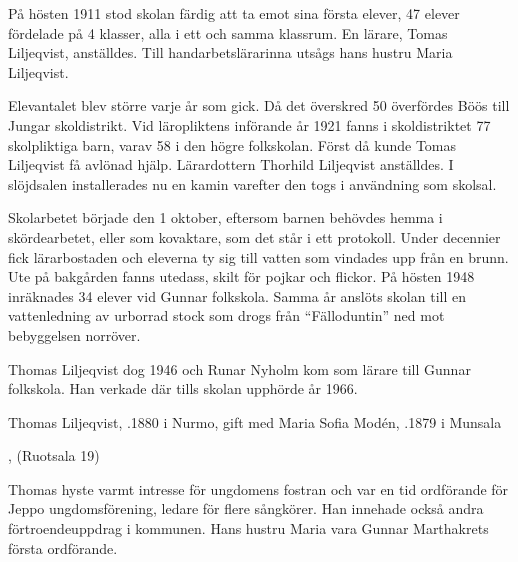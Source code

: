 På hösten 1911 stod skolan färdig att ta emot sina första elever, 47 elever fördelade på 4 klasser, alla i ett och samma klassrum. En lärare, Tomas Liljeqvist, anställdes. Till handarbetslärarinna utsågs hans hustru Maria Liljeqvist.

Elevantalet blev större varje år som gick. Då det överskred 50 överfördes Böös till Jungar skoldistrikt. Vid läropliktens införande år 1921 fanns i skoldistriktet 77 skolpliktiga barn, varav 58 i den högre folkskolan. Först då kunde Tomas Liljeqvist få avlönad hjälp. Lärardottern Thorhild Liljeqvist anställdes. I slöjdsalen installerades nu en kamin varefter den togs i användning som skolsal.

Skolarbetet började den 1 oktober, eftersom barnen behövdes hemma i skördearbetet, eller som kovaktare, som det står i ett protokoll. Under decennier fick lärarbostaden och eleverna ty sig till vatten som vindades upp från en brunn. Ute på bakgården fanns utedass, skilt för pojkar och flickor. På hösten 1948 inräknades 34 elever vid Gunnar folkskola. Samma år anslöts skolan till en vattenledning av urborrad stock som drogs från ``Fälloduntin'' ned mot bebyggelsen norröver.

Thomas Liljeqvist dog 1946 och Runar Nyholm kom som lärare till Gunnar folkskola. Han verkade där tills skolan upphörde år 1966.



Thomas Liljeqvist, .1880 i Nurmo, gift med Maria Sofia Modén,  .1879 i Munsala
\begin{jhchildren}
  \item {}
  \item {}
  \item {}
  \item {}
  \item {}, (Ruotsala 19)
\end{jhchildren}
Thomas hyste varmt intresse för ungdomens fostran och var en tid ordförande för Jeppo ungdomsförening, ledare för flere sångkörer. Han innehade också andra förtroendeuppdrag i kommunen. Hans hustru Maria vara Gunnar Marthakrets första ordförande.

